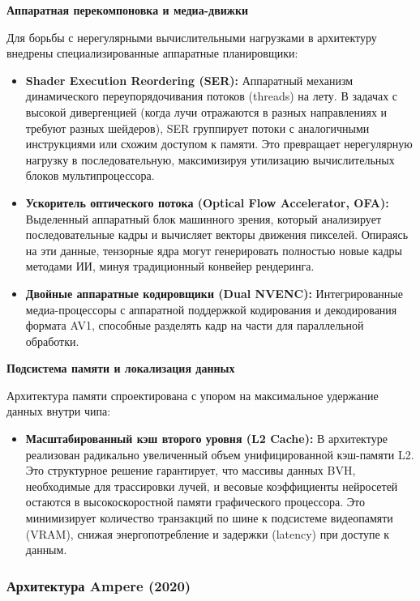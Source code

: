 \documentclass{article}[14pt]
\begin{document}
\medskip

\noindent \textbf{Аппаратная перекомпоновка и медиа-движки}

Для борьбы с нерегулярными вычислительными нагрузками в архитектуру внедрены специализированные аппаратные планировщики:
\begin{itemize}
    \item \textbf{Shader Execution Reordering (SER):} Аппаратный механизм динамического переупорядочивания потоков (threads) на лету. 
	В задачах с высокой дивергенцией (когда лучи отражаются в разных направлениях и требуют разных шейдеров), SER группирует потоки с 
	аналогичными инструкциями или схожим доступом к памяти. Это превращает нерегулярную нагрузку в последовательную, максимизируя утилизацию 
	вычислительных блоков мультипроцессора.
    \item \textbf{Ускоритель оптического потока (Optical Flow Accelerator, OFA):} Выделенный аппаратный блок машинного зрения, который 
	анализирует последовательные кадры и вычисляет векторы движения пикселей. Опираясь на эти данные, тензорные ядра могут генерировать 
	полностью новые кадры методами ИИ, минуя традиционный конвейер рендеринга.
    \item \textbf{Двойные аппаратные кодировщики (Dual NVENC):} Интегрированные медиа-процессоры с аппаратной поддержкой кодирования и 
	декодирования формата AV1, способные разделять кадр на части для параллельной обработки.
\end{itemize}

\medskip

\noindent \textbf{Подсистема памяти и локализация данных}

Архитектура памяти спроектирована с упором на максимальное удержание данных внутри чипа:
\begin{itemize}
    \item \textbf{Масштабированный кэш второго уровня (L2 Cache):} В архитектуре реализован радикально увеличенный объем унифицированной 
	кэш-памяти L2. Это структурное решение гарантирует, что массивы данных BVH, необходимые для трассировки лучей, и весовые коэффициенты 
	нейросетей остаются в высокоскоростной памяти графического процессора. Это минимизирует количество транзакций по шине к подсистеме 
	видеопамяти (VRAM), снижая энергопотребление и задержки (latency) при доступе к данным.
\end{itemize}

\subsubsection{Архитектура Ampere (2020)}
\end{document}
